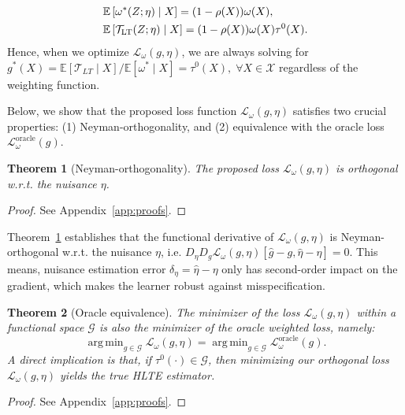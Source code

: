 \documentclass{article}
\theoremstyle{plain}
\newtheorem{theorem}{Theorem}[section]
\theoremstyle{definition}
\theoremstyle{remark}
\newcommand{\E}{\mathbb{E}}                %
\newcommand{\1}{\mathds{1}}                %
\DeclareMathOperator*{\argmin}{arg\,min}
\newcommand{\methods}{LT-O-learners\xspace}
\begin{document}
\begin{align}
    \E&\left[\omega^*(Z;\eta)\mid X\right] = (1-\rho(X))\omega(X) , \notag \\
    \E&\left[\mathcal{T}_\mathrm{LT}(Z;\eta) \mid X\right] = (1-\rho(X))\omega(X) \tau^0(X).  \notag
\end{align}
Hence, when we optimize $\mathcal{L}_\omega(g, \eta)$, we are always solving for $g^*(X)=\E\left[\mathcal{T}_{LT} \mid X\right] / \E\left[\omega^*\mid X\right]=\tau^0(X), \; \forall X\in \mathcal{X}$ regardless of the weighting function. 


Below, we show that the proposed loss function $\mathcal{L}_\omega(g, \eta)$ satisfies two crucial properties: (1) Neyman-orthogonality, and (2) equivalence with the oracle loss $\mathcal{L}_\omega^{\text{oracle}}(g)$.

\begin{theorem}[Neyman-orthogonality]
    \label{thm:orthogonality}
    The proposed loss $\mathcal{L}_\omega(g, \eta)$ is orthogonal w.r.t. the nuisance $\eta$.
    \vspace{-0.1cm}
\end{theorem}
\begin{proof}
    See Appendix~\ref{app:proofs}.
\end{proof}
Theorem~\ref{thm:orthogonality} establishes that the functional derivative of $\mathcal{L}_\omega(g, \eta)$ is Neyman-orthogonal w.r.t. the nuisance $\eta$, i.e. $D_\eta D_g \mathcal{L}_\omega(g, \eta)[\hat{g}-g, \hat\eta - \eta] = 0.$ This means, nuisance estimation error $\delta_\eta=\hat\eta-\eta$ only has second-order impact on the gradient, which makes the learner robust against misspecification.

\begin{theorem}[Oracle equivalence]
    \label{thm:equiv-loss}
    The minimizer of the loss $\mathcal{L}_\omega(g, \eta)$ within a functional space $\mathcal{G}$ is also the minimizer of the oracle weighted loss, namely:
    \begin{equation}
        \argmin_{g\in \mathcal{G}} \mathcal{L}_\omega(g, \eta) = \argmin_{g \in \mathcal{G}} \mathcal{L}_\omega^{\mathrm{oracle}}(g).
    \end{equation}
    A direct implication is that, if $\tau^0(\cdot)\in \mathcal{G}$, then minimizing our orthogonal loss $\mathcal{L}_\omega(g, \eta)$ yields the true HLTE estimator.
\end{theorem}
\begin{proof}
    See Appendix~\ref{app:proofs}.
\end{proof}
\end{document}
